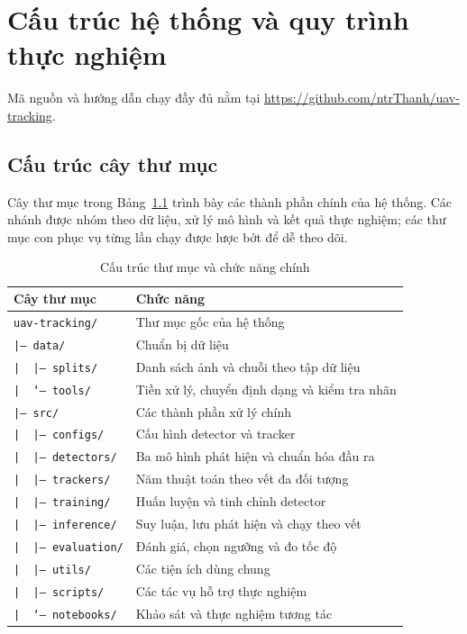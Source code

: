\documentclass[fontsize=13pt,a4paper,oneside,parskip=false,numbers=noenddot,bibliography=totoc]{scrreprt}
\begin{document}
\chapter{Cấu trúc hệ thống và quy trình thực nghiệm}
\label{app:ma-nguon}
Mã nguồn và hướng dẫn chạy đầy đủ nằm tại \url{https://github.com/ntrThanh/uav-tracking}.


\section{Cấu trúc cây thư mục}
Cây thư mục trong Bảng~\ref{tab:cay-thu-muc} trình bày các thành phần chính của hệ thống. Các nhánh được nhóm theo dữ liệu, xử lý mô hình và kết quả thực nghiệm; các thư mục con phục vụ từng lần chạy được lược bớt để dễ theo dõi.

\begin{table}[H]
  \centering\small
  \caption{Cấu trúc thư mục và chức năng chính}
  \label{tab:cay-thu-muc}
  \begin{tabularx}{\linewidth}{@{}l>{\raggedright\arraybackslash}X@{}}
    \toprule
    \textbf{Cây thư mục} & \textbf{Chức năng}\\
    \midrule
    \texttt{uav-tracking/} & Thư mục gốc của hệ thống\\
    \texttt{|-- data/} & Chuẩn bị dữ liệu\\
    \texttt{|\ \ |-- splits/} & Danh sách ảnh và chuỗi theo tập dữ liệu\\
    \texttt{|\ \ `-- tools/} & Tiền xử lý, chuyển định dạng và kiểm tra nhãn\\
    \texttt{|-- src/} & Các thành phần xử lý chính\\
    \texttt{|\ \ |-- configs/} & Cấu hình detector và tracker\\
    \texttt{|\ \ |-- detectors/} & Ba mô hình phát hiện và chuẩn hóa đầu ra\\
    \texttt{|\ \ |-- trackers/} & Năm thuật toán theo vết đa đối tượng\\
    \texttt{|\ \ |-- training/} & Huấn luyện và tinh chỉnh detector\\
    \texttt{|\ \ |-- inference/} & Suy luận, lưu phát hiện và chạy theo vết\\
    \texttt{|\ \ |-- evaluation/} & Đánh giá, chọn ngưỡng và đo tốc độ\\
    \texttt{|\ \ |-- utils/} & Các tiện ích dùng chung\\
    \texttt{|\ \ |-- scripts/} & Các tác vụ hỗ trợ thực nghiệm\\
    \texttt{|\ \ `-- notebooks/} & Khảo sát và thực nghiệm tương tác\\

\end{tabularx}
\end{table}
\end{document}
